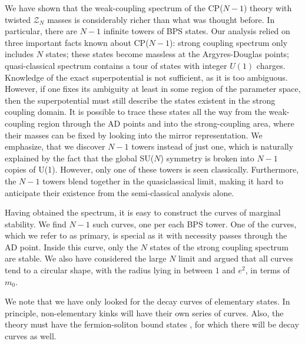 \documentclass[epsfig,12pt]{article}
\newcommand{\mc}[1]{\mathcal{#1}}
\begin{document}
	We have shown that the weak-coupling spectrum of the CP($N-1$) theory with 
	twisted $ \mc{Z}_N $ masses is considerably richer than what was thought before.
	In particular, there are $ N - 1 $ infinite towers of BPS states. 
	Our analysis relied on three important facts known about CP($N-1$): 
	strong coupling spectrum only includes $ N $ states; these states become massless at 
	the Argyres-Douglas points; quasi-classical spectrum contains a tour of states with
	integer $ U(1) $ charges.
	Knowledge of the exact superpotential is not sufficient, as it is too ambiguous.
	However, if one fixes its ambiguity at least in some region of the parameter space,
	then the superpotential must still describe the states existent in the strong
	coupling domain.
	It is possible to trace these states all the way from the weak-coupling region 
	through the AD points and into the strong-coupling area, where their masses can be fixed
	by looking into the mirror representation.
	We emphasize, that we discover $ N - 1 $ towers instead of just one, which is naturally
	explained by the fact that the global SU($ N $) symmetry is broken into $ N-1 $ copies of U(1).
	However, only one of these towers is seen classically. 
	Furthermore, the $ N - 1 $ towers blend together in the quasiclassical limit, 
	making it hard to anticipate their existence from the semi-classical analysis alone.
		
	Having obtained the spectrum, it is easy to construct the curves of marginal stability.
	We find $ N - 1 $ such curves, one per each BPS tower.
	One of the curves, which we refer to as primary, is special as it with necessity 
	passes through the AD point. 
	Inside this curve, only the $ N $ states of the strong coupling spectrum are stable.
	We also have considered the large $ N $ limit and argued that all curves tend to a
	circular shape, with the radius lying in between $ 1 $ and $ e^2 $, in terms of $ m_0 $.

	We note that we have only looked for the decay curves of elementary states. 
	In principle, non-elementary kinks will have their own series of curves.
	Also, the theory must have the fermion-soliton bound states \cite{Dorey:1999zk}, 
	for which there will be decay curves as well.
\end{document}
